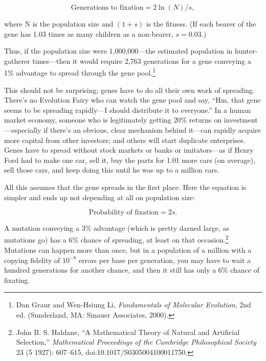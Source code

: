 \begin{equation*}
 \text{Generations to fixation} = 2 \ln(N) / s,
\end{equation*}


{
 where N is the population size and $(1 + s)$ is the fitness. (If
each bearer of the gene has 1.03 times as many children as a
non-bearer, $s = 0.03$.) }

{
 Thus, if the population size were 1,000,000---the estimated
population in hunter-gatherer times---then it would require 2,763
generations for a gene conveying a 1\% advantage to spread through the
gene pool.\footnote{Dan Graur and Wen-Hsiung Li, \textit{Fundamentals of Molecular
Evolution}, 2nd ed. (Sunderland, MA: Sinauer Associates, 2000).}}

{
 This should not be surprising; genes have to do all their own work
of spreading. There's no Evolution Fairy who can watch
the gene pool and say, ``Hm, that gene seems to be
spreading rapidly---I should distribute it to
everyone.'' In a human market economy, someone who is
legitimately getting 20\% returns on investment---especially if
there's an obvious, clear mechanism behind it---can
rapidly acquire more capital from other investors; and others will
start duplicate enterprises. Genes have to spread without stock markets
or banks or imitators---as if Henry Ford had to make one car, sell it,
buy the parts for 1.01 more cars (on average), sell those cars, and
keep doing this until he was up to a million cars.}

{
 All this assumes that the gene spreads in the first place. Here
the equation is simpler and ends up not depending at all on population
size:}

\begin{equation*}
\text{Probability of fixation} = 2s.
\end{equation*}


{
 A mutation conveying a 3\% advantage (which is pretty darned
large, as mutations go) has a 6\% chance of spreading, at least on that
occasion.\footnote{John B. S. Haldane, ``A Mathematical Theory of
Natural and Artificial Selection,''
\textit{Mathematical Proceedings of the Cambridge Philosophical
Society} 23 (5 1927): 607--615, doi:10.1017/S0305004100011750.} Mutations can happen more than once, but
in a population of a million with a copying fidelity of
$10^{-8}$ errors per base per generation, you may have
to wait a hundred generations for another chance, and then it still has
only a 6\% chance of fixating. }

